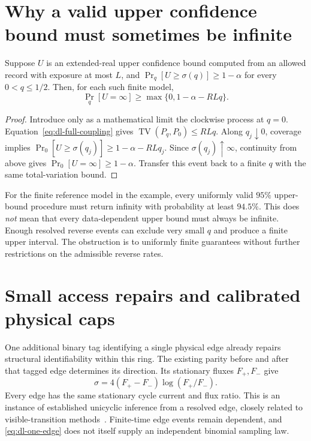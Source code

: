 \section{Why a valid upper confidence bound must sometimes be infinite}
\begin{theorem}
Suppose $U$ is an extended-real upper confidence bound computed from an allowed
record with exposure at most $L$, and
$\Pr_q[U\ge\sigma(q)]\ge1-\alpha$ for every $0<q\le1/2$.
Then, for each such finite model,
\begin{equation}
 \Pr_q[U=\infty]\ge\max\{0,1-\alpha-RLq\}.            \label{eq:dl-infinity}
\end{equation}
\end{theorem}
\begin{proof}
Introduce only as a mathematical limit the clockwise process at $q=0$.
Equation~\eqref{eq:dl-full-coupling} gives
$\operatorname{TV}(P_q,P_0)\le RLq$. Along $q_j\downarrow0$, coverage implies
$\Pr_0[U\ge\sigma(q_j)]\ge1-\alpha-RLq_j$. Since
$\sigma(q_j)\uparrow\infty$, continuity from above gives
$\Pr_0[U=\infty]\ge1-\alpha$. Transfer this event back to a finite $q$ with
the same total-variation bound.
\end{proof}

For the finite reference model in the example, every uniformly valid $95\%$
upper-bound procedure must return infinity with probability at least $94.5\%$.
This does \emph{not} mean that every data-dependent upper bound must always be
infinite. Enough resolved reverse events can exclude very small $q$ and produce
a finite upper interval. The obstruction is to uniformly finite guarantees
without further restrictions on the admissible reverse rates.

\section{Small access repairs and calibrated physical caps}
One additional binary tag identifying a single physical edge already repairs
structural identifiability within this ring. The existing parity before and
after that tagged edge determines its direction. Its stationary fluxes
$F_+,F_-$ give
\begin{equation}
 \sigma=4(F_+-F_-)\log(F_+/F_-).                        \label{eq:dl-one-edge}
\end{equation}
Every edge has the same stationary cycle current and flux ratio. This is an
instance of established unicyclic inference from a resolved edge, closely related
to visible-transition methods~\cite{ciHarunari2022}. Finite-time edge events
remain dependent, and \eqref{eq:dl-one-edge} does not itself supply an independent
binomial sampling law.

